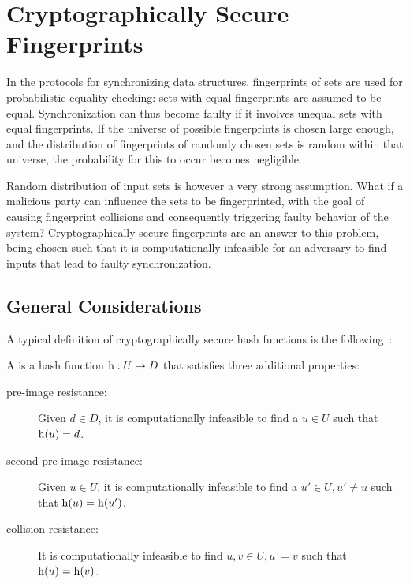 \section{Cryptographically Secure Fingerprints}
\label{crypto}

In the protocols for synchronizing data structures, fingerprints of sets are used for probabilistic equality checking: sets with equal fingerprints are assumed to be equal. Synchronization can thus become faulty if it involves unequal sets with equal fingerprints. If the universe of possible fingerprints is chosen large enough, and the distribution of fingerprints of randomly chosen sets is random within that universe, the probability for this to occur becomes negligible.

Random distribution of input sets is however a very strong assumption. What if a malicious party can influence the sets to be fingerprinted, with the goal of causing fingerprint collisions and consequently triggering faulty behavior of the system? Cryptographically secure fingerprints are an answer to this problem, being chosen such that it is computationally infeasible for an adversary to find inputs that lead to faulty synchronization.

\subsection{General Considerations}
\label{crypto-general}

A typical definition of cryptographically secure hash functions is the following~\cite{menezes2018handbook}:

\begin{definition}
A  is a hash function ${\operatorname{h}}: {U} \rightarrow {D}$ that satisfies three additional properties:

\begin{description}
  \item[pre-image resistance:] Given $d \in D$, it is computationally infeasible to find a $u \in U$ such that $\operatorname{h}(u) = d$.
  \item[second pre-image resistance:] Given $u \in U$, it is computationally infeasible to find a $u' \in U, u' \neq u$ such that $\operatorname{h}(u) = \operatorname{h}(u')$.
  \item[collision resistance:] It is computationally infeasible to find $u, v \in U, u ~= v$ such that $\operatorname{h}(u) = \operatorname{h}(v)$.
\end{description}
\end{definition}

